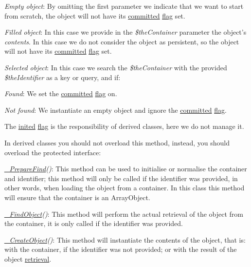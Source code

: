 \begin{DoxyItemize}
\item {\itshape Empty object\/}\-: By omitting the first parameter we indicate that we want to start from scratch, the object will not have its \hyperlink{class_c_persistent_object_a6520a7bcecf3f39fd61ec6d08f736e77}{committed} \hyperlink{}{flag} set. 
\item {\itshape Filled object\/}\-: In this case we provide in the {\itshape \$the\-Container\/} parameter the object's {\itshape contents\/}. In this case we do not consider the object as persistent, so the object will not have its \hyperlink{class_c_persistent_object_a6520a7bcecf3f39fd61ec6d08f736e77}{committed} \hyperlink{}{flag} set. 
\item {\itshape Selected object\/}\-: In this case we search the {\itshape \$the\-Container\/} with the provided {\itshape \$the\-Identifier\/} as a key or query, and if\-: 
\begin{DoxyItemize}
\item {\itshape Found\/}\-: We set the \hyperlink{class_c_persistent_object_a6520a7bcecf3f39fd61ec6d08f736e77}{committed} \hyperlink{}{flag} on. 
\item {\itshape Not found\/}\-: We instantiate an empty object and ignore the \hyperlink{class_c_persistent_object_a6520a7bcecf3f39fd61ec6d08f736e77}{committed} \hyperlink{}{flag}. 
\end{DoxyItemize}
\end{DoxyItemize}

The \hyperlink{class_c_status_object_a8429102e4f52f7558649b64f4e673a69}{inited} \hyperlink{}{flag} is the responsibility of derived classes, here we do not manage it.

In derived classes you should not overload this method, instead, you should overload the protected interface\-:


\begin{DoxyItemize}
\item {\itshape \hyperlink{class_c_persistent_object_a1d9808bf48214b1b34b3e646ad2e981e}{\-\_\-\-Prepare\-Find}()\/}\-: This method can be used to initialise or normalise the container and identifier; this method will only be called if the identifier was provided, in other words, when loading the object from a container. In this class this method will ensure that the container is an Array\-Object. 
\item {\itshape \hyperlink{class_c_persistent_object_afd733566c87bf239a3232bdf3aa982bc}{\-\_\-\-Find\-Object}()\/}\-: This method will perform the actual retrieval of the object from the container, it is only called if the identifier was provided. 
\item {\itshape \hyperlink{class_c_persistent_object_a3f3f673d9b838de05c39789345c06231}{\-\_\-\-Create\-Object}()\/}\-: This method will instantiate the contents of the object, that is\-: with the container, if the identifier was not provided; or with the result of the object \hyperlink{class_c_persistent_object_afd733566c87bf239a3232bdf3aa982bc}{retrieval}. 
\end{DoxyItemize}



